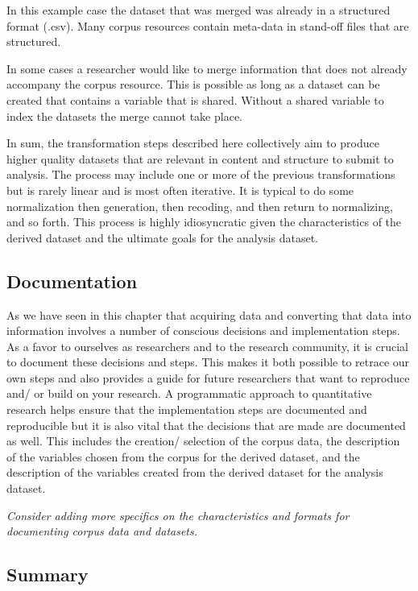\documentclass[
]{article}
\begin{document}
In this example case the dataset that was merged was already in a structured format (.csv). Many corpus resources contain meta-data in stand-off files that are structured.

In some cases a researcher would like to merge information that does not already accompany the corpus resource. This is possible as long as a dataset can be created that contains a variable that is shared. Without a shared variable to index the datasets the merge cannot take place.

In sum, the transformation steps described here collectively aim to produce higher quality datasets that are relevant in content and structure to submit to analysis. The process may include one or more of the previous transformations but is rarely linear and is most often iterative. It is typical to do some normalization then generation, then recoding, and then return to normalizing, and so forth. This process is highly idiosyncratic given the characteristics of the derived dataset and the ultimate goals for the analysis dataset.

\hypertarget{documentation}{%
\subsection{Documentation}\label{documentation}}

As we have seen in this chapter that acquiring data and converting that data into information involves a number of conscious decisions and implementation steps. As a favor to ourselves as researchers and to the research community, it is crucial to document these decisions and steps. This makes it both possible to retrace our own steps and also provides a guide for future researchers that want to reproduce and/ or build on your research. A programmatic approach to quantitative research helps ensure that the implementation steps are documented and reproducible but it is also vital that the decisions that are made are documented as well. This includes the creation/ selection of the corpus data, the description of the variables chosen from the corpus for the derived dataset, and the description of the variables created from the derived dataset for the analysis dataset.

\emph{Consider adding more specifics on the characteristics and formats for documenting corpus data and datasets.}

\hypertarget{summary-1}{%
\subsection{Summary}\label{summary-1}}
\end{document}
